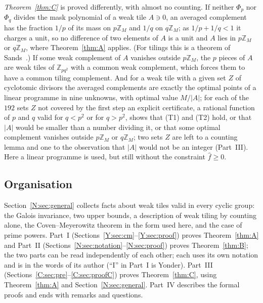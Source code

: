 \documentclass[11pt,a4paper]{amsart}
\theoremstyle{definition}
\theoremstyle{remark}
\newcommand{\Z}{\mathbb{Z}}
\begin{document}
\emph{Theorem~\ref{thm:C}} is proved differently, with almost no counting. If neither $\Phi_p$ nor $\Phi_q$
divides the mask polynomial of a weak tile $A\ni0$, an averaged complement has the fraction $1/p$ of its mass on
$p\Z_M$ and $1/q$ on $q\Z_M$; as $1/p+1/q<1$ it charges a unit, so no difference of two elements of $A$ is a
unit and $A$ lies in $p\Z_M$ or $q\Z_M$, where Theorem~\ref{thm:A} applies. (For tilings this is a theorem of
Sands~\cite{Sa}.) If some weak complement of $A$ vanishes outside $p\Z_M$, the $p$ pieces of $A$ are weak tiles
of $\Z_{pq^2}$ with a common weak complement, which forces them to have a common tiling complement. And for a
weak tile with a given set $Z$ of cyclotomic divisors the averaged complements are exactly the optimal points of
a linear programme in nine unknowns, with optimal value $M/|A|$; for each of the $192$ sets $Z$ not covered by
the first step an explicit certificate, a rational function of $p$ and $q$ valid for $q<p^2$ or for $q>p^2$,
shows that (T1) and (T2) hold, or that $|A|$ would be smaller than a number dividing it, or that some optimal
complement vanishes outside $p\Z_M$ or $q\Z_M$; two sets $Z$ are left to a counting lemma and one to the
observation that $|A|$ would not be an integer (Part~III). Here a linear programme is used, but still without
the constraint $\hat f\ge0$.

\subsection*{Organisation} Section~\ref{N:sec:general} collects facts about weak tiles valid in every cyclic
group: the Galois invariance, two upper bounds, a description of weak tiling by counting alone, the
Coven--Meyerowitz theorem in the form used here, and the case of prime powers. Part~I
(Sections~\ref{Y:sec:cm}--\ref{Y:sec:proof}) proves Theorem~\ref{thm:A} and Part~II
(Sections~\ref{N:sec:notation}--\ref{N:sec:proof}) proves Theorem~\ref{thm:B}; the two parts can be read
independently of each other; each uses its own notation and is in the words of its author (``I'' in Part~I
is Yonder). Part~III (Sections~\ref{C:sec:pre}--\ref{C:sec:proofC}) proves Theorem~\ref{thm:C}, using
Theorem~\ref{thm:A} and Section~\ref{N:sec:general}. Part~IV describes the formal proofs and ends with
remarks and questions.
\end{document}
